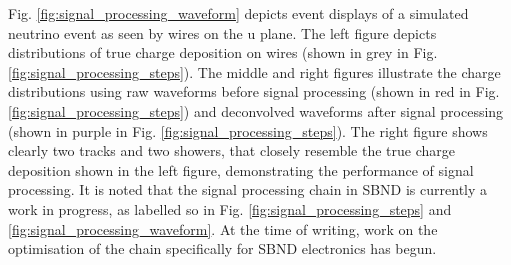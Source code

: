 Fig. \ref{fig:signal_processing_waveform} depicts event displays of a simulated neutrino event as seen by wires on the u plane.
The left figure depicts distributions of true charge deposition on wires (shown in grey in Fig. \ref{fig:signal_processing_steps}).
The middle and right figures illustrate the charge distributions using raw waveforms before signal processing (shown in red in Fig. \ref{fig:signal_processing_steps}) and deconvolved waveforms after signal processing (shown in purple in Fig. \ref{fig:signal_processing_steps}).
The right figure shows clearly two tracks and two showers, that closely resemble the true charge deposition shown in the left figure, demonstrating the performance of signal processing.
It is noted that the signal processing chain in SBND is currently a work in progress, as labelled so in Fig. \ref{fig:signal_processing_steps} and \ref{fig:signal_processing_waveform}.
At the time of writing, work on the optimisation of the chain specifically for SBND electronics has begun.

